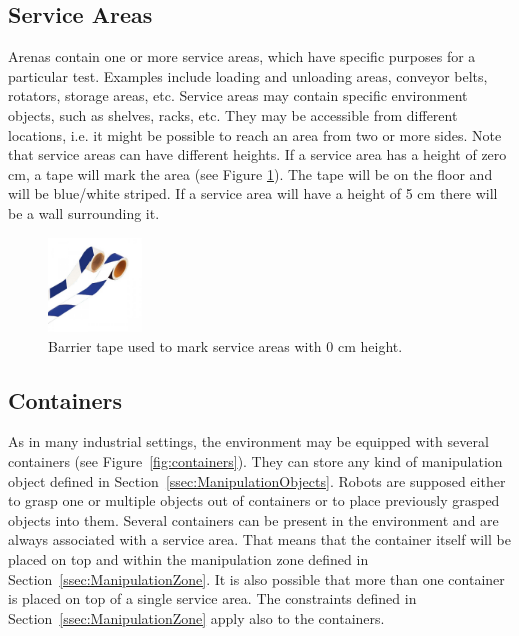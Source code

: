 \subsection{Service Areas}
Arenas contain one or more service areas, which have specific purposes for a particular test. Examples include loading and unloading areas, conveyor belts, rotators, storage areas, etc. Service areas may contain specific environment objects, such as shelves, racks, etc. They may be accessible from different locations, i.e. it might be possible to reach an area from two or more sides. Note that service areas can have different heights. If a service area has a height of zero cm, a tape will mark the area (see Figure \ref{fig:barrier_tape_0cm}). The tape will be on the floor and will be blue/white striped. If a service area will have a height of 5 cm there will be a wall surrounding it.

\begin{figure} [h!]
\begin{center}
\includegraphics[height = 2.5cm]{./images/barrier_tape_0cm_area.jpg}
\end{center}
\caption{Barrier tape used to mark service areas with 0 cm height.}
\label{fig:barrier_tape_0cm}
\end{figure}


\subsection{Containers}
As in many industrial settings, the \RCAW environment may be equipped with several containers (see Figure~\ref{fig:containers}). They can store any kind of manipulation object defined in Section~\ref{ssec:ManipulationObjects}. Robots are supposed either to grasp one or multiple objects out of containers or to place previously grasped objects into them. Several containers can be present in the environment and are always associated with a service area. That means that the container itself will be placed on top and within the manipulation zone defined in Section~\ref{ssec:ManipulationZone}. 
It is also possible that more than one container is placed on top of a single service area.
The constraints defined in Section~\ref{ssec:ManipulationZone} apply also to the containers.

